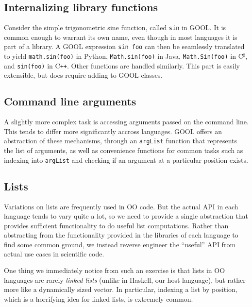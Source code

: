 \documentclass[sigplan,review,anonymous,prologue,dvipsnames]{acmart}
\newcommand{\Csharp}{C$^{\sharp}$}
\newcommand{\Cplusplus}{C\texttt{++}}
\begin{document}
\subsection{Internalizing library functions}

Consider the simple trigonometric sine function, called \verb|sin| in
GOOL. It is common enough to warrant its own name, even though in most
languages it is part of a library.  A GOOL expression \verb|sin foo|
can then be seamlessly translated to 
yield \verb|math.sin(foo)| in Python, \verb|Math.sin(foo)| in Java,
\verb|Math.Sin(foo)| in \Csharp, and \verb|sin(foo)| in \Cplusplus. Other
functions are handled similarly.  This part is easily extensible, but does
require adding to GOOL classes.

\subsection{Command line arguments}

A slightly more complex task is accessing arguments passed on the command
line. This tends to differ more significantly accross languages. GOOL
offers an abstraction of these mechanisms, through an \verb|argList| function
that represents the list of arguments, as well as convenience functions for
common tasks such as indexing into \verb|argList| and checking if an argument
at a particular position exists.

\subsection{Lists}

Variations on lists are frequently used in OO code.  But the actual API
in each language tends to vary quite a lot, so we need to provide a single
abstraction that provides sufficient functionality to do useful list
computations.  Rather than abstracting from the functionality provided
in the libraries of each language to find some common ground, we instead
reverse engineer the ``useful'' API from actual use cases in scientific
code.  

One thing we immediately notice from such an exercise is that lists in
OO languages are rarely \emph{linked lists} (unlike in Haskell, our host
language), but rather more like a dynamically sized vector. In particular,
indexing a list by position, which is a horrifying idea for linked lists,
is extremely common.
\end{document}
